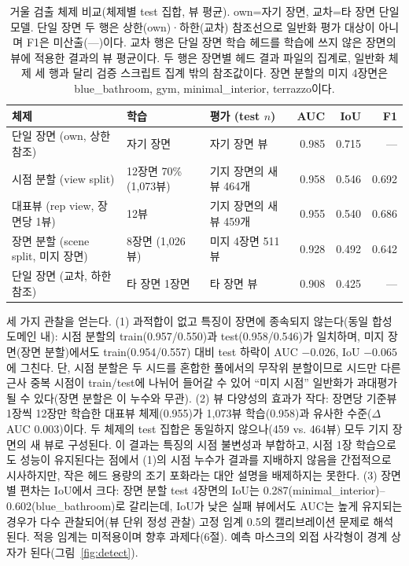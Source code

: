 \documentclass[twocolumn,10pt,a4paper]{article}
\begin{document}
\begin{table}[t]
\centering
\small
\caption{거울 검출 체제 비교(체제별 test 집합, 뷰 평균). own=자기 장면, 교차=타 장면 단일모델. 단일 장면 두 행은 상한(own)·하한(교차) 참조선으로 일반화 평가 대상이 아니며 F1은 미산출(---)이다. 교차 행은 단일 장면 학습 헤드를 학습에 쓰지 않은 장면의 뷰에 적용한 결과의 뷰 평균이다. 두 행은 장면별 헤드 결과 파일의 집계로, 일반화 체제 세 행과 달리 검증 스크립트 집계 밖의 참조값이다. 장면 분할의 미지 4장면은 blue\_bathroom, gym, minimal\_interior, terrazzo이다.}
\label{tab:detect}
\begin{tabular}{lllrrr}
\toprule
체제 & 학습 & 평가 (test $n$) & AUC & IoU & F1 \\
\midrule
단일 장면 (own, 상한 참조) & 자기 장면 & 자기 장면 뷰 & 0.985 & 0.715 & --- \\
시점 분할 (view split) & 12장면 70\% (1,073뷰) & 기지 장면의 새 뷰 464개 & 0.958 & 0.546 & 0.692 \\
대표뷰 (rep view, 장면당 1뷰) & 12뷰 & 기지 장면의 새 뷰 459개 & 0.955 & 0.540 & 0.686 \\
장면 분할 (scene split, 미지 장면) & 8장면 (1,026뷰) & 미지 4장면 511뷰 & 0.928 & 0.492 & 0.642 \\
단일 장면 (교차, 하한 참조) & 타 장면 1장면 & 타 장면 뷰 & 0.908 & 0.425 & --- \\
\bottomrule
\end{tabular}
\end{table}

세 가지 관찰을 얻는다. (1) 과적합이 없고 특징이 장면에 종속되지 않는다(동일 합성 도메인 내): 시점 분할의 train(0.957/0.550)과 test(0.958/0.546)가 일치하며, 미지 장면(장면 분할)에서도 train(0.954/0.557) 대비 test 하락이 AUC $-0.026$, IoU $-0.065$에 그친다. 단, 시점 분할은 두 시드를 혼합한 풀에서의 무작위 분할이므로 시드만 다른 근사 중복 시점이 train/test에 나뉘어 들어갈 수 있어 ``미지 시점'' 일반화가 과대평가될 수 있다(장면 분할은 이 누수와 무관). (2) 뷰 다양성의 효과가 작다: 장면당 기준뷰 1장씩 12장만 학습한 대표뷰 체제(0.955)가 1,073뷰 학습(0.958)과 유사한 수준($\Delta$AUC 0.003)이다. 두 체제의 test 집합은 동일하지 않으나(459 vs. 464뷰) 모두 기지 장면의 새 뷰로 구성된다. 이 결과는 특징의 시점 불변성과 부합하고, 시점 1장 학습으로도 성능이 유지된다는 점에서 (1)의 시점 누수가 결과를 지배하지 않음을 간접적으로 시사하지만, 작은 헤드 용량의 조기 포화라는 대안 설명을 배제하지는 못한다. (3) 장면별 편차는 IoU에서 크다: 장면 분할 test 4장면의 IoU는 0.287(minimal\_interior)--0.602(blue\_bathroom)로 갈리는데, IoU가 낮은 실패 뷰에서도 AUC는 높게 유지되는 경우가 다수 관찰되어(뷰 단위 정성 관찰) 고정 임계 0.5의 캘리브레이션 문제로 해석된다. 적응 임계는 미적용이며 향후 과제다(6절). 예측 마스크의 외접 사각형이 경계 상자가 된다(그림~\ref{fig:detect}).
\end{document}

